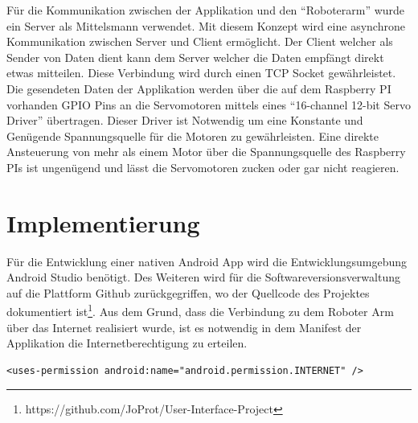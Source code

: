 \documentclass[12pt,					%
							 oneside,			%
							 a4paper,			%
							 halfparskip,		%
							 liststotoc,			%
							 bibtotoc,			%
							 fleqn,				%
							 pointlessnumbers]	%
							 {scrreprt}
\begin{document}

Für die Kommunikation zwischen der Applikation und den ``Roboterarm'' wurde ein Server als Mittelsmann verwendet. Mit diesem Konzept wird eine asynchrone Kommunikation zwischen Server und Client ermöglicht. Der Client welcher als Sender von Daten dient kann dem Server welcher die Daten empfängt direkt etwas mitteilen. Diese Verbindung wird durch einen TCP Socket gewährleistet. Die gesendeten Daten der Applikation werden über die auf dem Raspberry PI vorhanden GPIO Pins an die Servomotoren mittels eines  ``16-channel 12-bit Servo Driver'' übertragen. Dieser Driver ist Notwendig um eine Konstante und Genügende Spannungsquelle für die Motoren zu gewährleisten. Eine direkte Ansteuerung von mehr als einem Motor über die Spannungsquelle des Raspberry PIs ist ungenügend und lässt die Servomotoren zucken oder gar nicht reagieren.


\chapter{Implementierung}	
Für die Entwicklung einer nativen Android App wird die Entwicklungsumgebung Android Studio benötigt. Des Weiteren wird für die Softwareversionsverwaltung auf die Plattform Github zurückgegriffen, wo der Quellcode des Projektes dokumentiert ist\footnote{https://github.com/JoProt/User-Interface-Project}. Aus dem Grund, dass die Verbindung zu dem Roboter Arm über das Internet realisiert wurde, ist es notwendig in dem Manifest der Applikation die Internetberechtigung zu erteilen. \\
\begin{lstlisting}
<uses-permission android:name="android.permission.INTERNET" />
\end{lstlisting}
\end{document}
